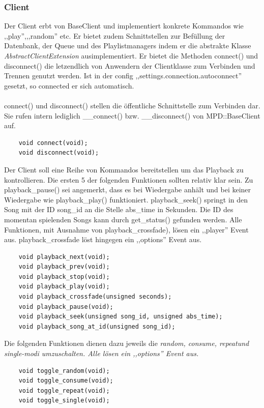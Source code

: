 \subsubsection{Client}
Der Client erbt von BaseClient und implementiert konkrete Kommandos wie ,,play'',,,random'' etc.
Er bietet zudem Schnittstellen zur Befüllung der Datenbank, der Queue und des Playlistmanagers indem 
er die abstrakte Klasse \emph{AbstractClientExtension} ausimplementiert.
Er bietet die Methoden connect() und disconnect() die letzendlich von Anwendern der Clientklasse zum Verbinden und Trennen genutzt werden. 
Ist in der config ,,settings.connection.autoconnect'' gesetzt, so connected er sich automatisch.
\\
\\
connect() und disconnect() stellen die öffentliche Schnittstelle zum Verbinden dar.
Sie rufen intern lediglich \_\_connect() bzw. \_\_disconnect() von MPD::BaseClient auf.
\begin{verbatim}
    void connect(void);
    void disconnect(void);
\end{verbatim}

Der Client soll eine Reihe von Kommandos bereitstellen um das Playback zu kontrollieren.
Die ersten 5 der folgenden Funktionen sollten relativ klar sein. 
Zu playback\_pause() sei angemerkt, dass es bei Wiedergabe anhält und bei keiner Wiedergabe wie playback\_play() funktioniert.
playback\_seek() springt in den Song mit der ID song\_id an die Stelle abs\_time in Sekunden.
Die ID des momentan spielenden Songs kann durch get\_status() gefunden werden.
Alle Funktionen, mit Ausnahme von playback\_crossfade), lösen ein ,,player'' Event aus. 
playback\_crossfade löst hingegen ein ,,options'' Event aus.
\begin{verbatim}
    void playback_next(void);
    void playback_prev(void);
    void playback_stop(void);
    void playback_play(void);
    void playback_crossfade(unsigned seconds);    
    void playback_pause(void);
    void playback_seek(unsigned song_id, unsigned abs_time);
    void playback_song_at_id(unsigned song_id);
\end{verbatim}

Die folgenden Funktionen dienen dazu jeweils die \it random, consume, repeat\rm und \textit{single}-modi umzuschalten.
Alle lösen ein ,,options'' Event aus.
\begin{verbatim}
    void toggle_random(void);
    void toggle_consume(void);
    void toggle_repeat(void);
    void toggle_single(void);
\end{verbatim}

